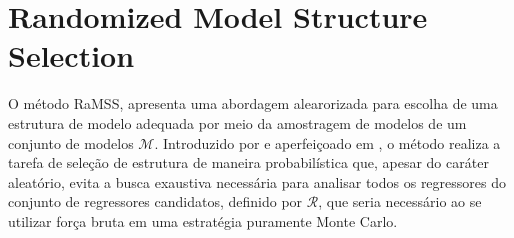 
\section{Randomized Model Structure Selection}%
\label{sec:ramss}


O método RaMSS, apresenta uma abordagem alearorizada para escolha de uma estrutura de modelo adequada por meio da amostragem de modelos de um conjunto de modelos $\mathscr{M}$. 
Introduzido por \cite{falsone2014} e aperfeiçoado em \cite{falsone2015}, o método realiza a tarefa de seleção de estrutura de maneira probabilística que, apesar do caráter aleatório, evita a busca exaustiva necessária para analisar todos os regressores do conjunto de regressores candidatos, definido por $\mathscr{R}$,
que seria necessário ao se utilizar força bruta em uma estratégia puramente Monte Carlo. 

